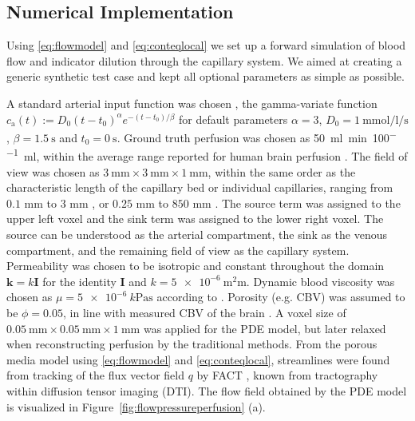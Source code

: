 \documentclass[journal,twocolumn]{IEEEtran}
\newcommand{\ca}{c_\mathrm{a}}
\newcommand{\simu}{k\pascal\second}
\newcommand{\siPml}{\milli\litre\per\minute\per100\milli\litre}
\begin{document}
	

	
	
		
	\subsection{Numerical Implementation}\label{sec:NumExp}
	Using \eqref{eq:flowmodel} and \eqref{eq:conteqlocal} we set up a forward simulation of blood flow and indicator dilution through the capillary system.
	We aimed at creating a generic synthetic test case and kept all optional parameters as simple as possible. 
	
	A standard arterial input function was chosen \cite{ostergaard96}, the gamma-variate function $\ca(t) := D_0(t-t_0)^\alpha e^{-(t-t_0)/\beta}$ for default parameters $\alpha=3$, $D_0 = \SI{1}{\milli\mol\per\litre\per\second}$, $\beta = \SI{1.5}{\second}$ and $t_0 = \SI{0}{\second}$.
	Ground truth perfusion was chosen as \SI{50}{\siPml}, within the average range reported for human brain perfusion \cite{Obrist1984,Smith00}. The field of view was chosen as $\SI{3}{\milli\meter}\times\SI{3}{\milli\meter}\times\SI{1}{\milli\meter}$, within the same order as the characteristic length of the capillary bed or individual capillaries, ranging from $0.1$ mm to $3$ mm \cite{Cho2011}, or $0.25$ mm to $850$ mm \cite{Townsley2012}.
	The source term was assigned to the upper left voxel and the sink term was assigned to the lower right voxel. The source can be understood as the arterial compartment, the sink as the venous compartment, and the remaining field of view as the capillary system. 
	Permeability was chosen to be isotropic and constant throughout the domain $\mathbf{k}=k\mathbf{I}$ for the identity $\mathbf{I}$ and $k=\SI{5e-6}{\square\milli\meter}$.
	Dynamic blood viscosity was chosen as $\mu=\SI{5e-6}{\simu}$ according to \cite{rosencranz06}.
	Porosity (e.g. CBV) was assumed to be $\phi = 0.05$, in line with measured CBV of the brain \cite{Smith00}.
A voxel size of $\SI{0.05}{\milli\meter} \times\SI{0.05}{\milli\meter}\times\SI{1}{\milli\meter}$ was applied for the PDE model, but later relaxed when reconstructing perfusion by the traditional methods. From the porous media model using \eqref{eq:flowmodel} and \eqref{eq:conteqlocal}, streamlines were found from tracking of the flux vector field $q$ by FACT \cite{Mori1998}, known from  tractography within diffusion tensor imaging (DTI). 
	The flow field obtained by the PDE model is visualized in Figure~\ref{fig:flowpressureperfusion} (a).
	
\end{document}
